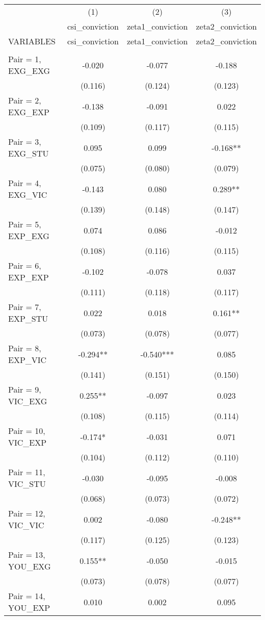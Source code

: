 \documentclass[]{article}
\begin{document}
\begin{tabular}{lccc} \hline
 & (1) & (2) & (3) \\
 & csi\_conviction & zeta1\_conviction & zeta2\_conviction \\
VARIABLES & csi\_conviction & zeta1\_conviction & zeta2\_conviction \\ \hline
 &  &  &  \\
Pair = 1, EXG\_EXG & -0.020 & -0.077 & -0.188 \\
 & (0.116) & (0.124) & (0.123) \\
Pair = 2, EXG\_EXP & -0.138 & -0.091 & 0.022 \\
 & (0.109) & (0.117) & (0.115) \\
Pair = 3, EXG\_STU & 0.095 & 0.099 & -0.168** \\
 & (0.075) & (0.080) & (0.079) \\
Pair = 4, EXG\_VIC & -0.143 & 0.080 & 0.289** \\
 & (0.139) & (0.148) & (0.147) \\
Pair = 5, EXP\_EXG & 0.074 & 0.086 & -0.012 \\
 & (0.108) & (0.116) & (0.115) \\
Pair = 6, EXP\_EXP & -0.102 & -0.078 & 0.037 \\
 & (0.111) & (0.118) & (0.117) \\
Pair = 7, EXP\_STU & 0.022 & 0.018 & 0.161** \\
 & (0.073) & (0.078) & (0.077) \\
Pair = 8, EXP\_VIC & -0.294** & -0.540*** & 0.085 \\
 & (0.141) & (0.151) & (0.150) \\
Pair = 9, VIC\_EXG & 0.255** & -0.097 & 0.023 \\
 & (0.108) & (0.115) & (0.114) \\
Pair = 10, VIC\_EXP & -0.174* & -0.031 & 0.071 \\
 & (0.104) & (0.112) & (0.110) \\
Pair = 11, VIC\_STU & -0.030 & -0.095 & -0.008 \\
 & (0.068) & (0.073) & (0.072) \\
Pair = 12, VIC\_VIC & 0.002 & -0.080 & -0.248** \\
 & (0.117) & (0.125) & (0.123) \\
Pair = 13, YOU\_EXG & 0.155** & -0.050 & -0.015 \\
 & (0.073) & (0.078) & (0.077) \\
Pair = 14, YOU\_EXP & 0.010 & 0.002 & 0.095 \\

\end{tabular}
\end{document}
